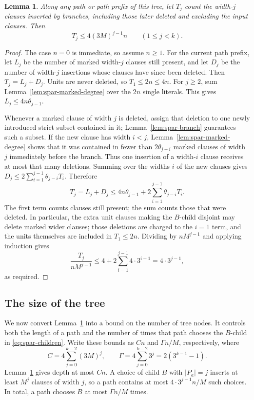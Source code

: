 \documentclass[11pt,reqno]{amsart}
\numberwithin{equation}{section}
\newtheorem{lemma}[theorem]{Lemma}
\theoremstyle{definition}\newtheorem{definition}[theorem]{Definition}
\theoremstyle{remark}\newtheorem{remark}[theorem]{Remark}
\renewcommand{\le}{\leqslant}
\renewcommand{\ge}{\geqslant}
\begin{document}
\begin{lemma}\label{lem:spar-insertion-bound}
Along any path or path prefix of this tree, let $T_j$ count the
width-$j$ clauses inserted by branches, including those later deleted
and excluding the input clauses. Then
\[
 T_j\le4(3M)^{j-1}n\qquad(1\le j<k).
\]
\end{lemma}
\begin{proof}
The case $n=0$ is immediate, so assume $n\ge1$.
For the current path prefix, let $L_j$ be the number of marked
width-$j$ clauses still present, and let $D_j$ be the number of
width-$j$ insertions whose clauses have since been deleted.
Then $T_j=L_j+D_j$.
Units are never deleted, so $T_1\le2n\le4n$.
For $j\ge2$, sum Lemma~\ref{lem:spar-marked-degree} over the $2n$
single literals. This gives $L_j\le4n\theta_{j-1}$.

Whenever a marked clause of width $j$ is deleted, assign that deletion
to one newly introduced strict subset contained in it;
Lemma~\ref{lem:spar-branch} guarantees such a subset.
If the new clause has width $i<j$, Lemma~\ref{lem:spar-marked-degree}
shows that it was contained in fewer than $2\theta_{j-i}$ marked
clauses of width $j$ immediately before the branch.
Thus one insertion of a width-$i$ clause receives at most that
many deletions. Summing over the widths $i$ of the new clauses gives
$D_j\le2\sum_{i=1}^{j-1}\theta_{j-i}T_i$. Therefore
\begin{equation}\label{eq:spar-insertions}
 T_j=L_j+D_j\le4n\theta_{j-1}
       +2\sum_{i=1}^{j-1}\theta_{j-i}T_i.
\end{equation}
The first term counts clauses still present; the sum counts those that
were deleted. In particular, the extra unit clauses making the
$B$-child disjoint may delete marked wider clauses; those deletions
are charged to the $i=1$ term, and the units themselves are included
in $T_1\le2n$. Dividing by $nM^{j-1}$ and applying induction gives
\[
 \frac{T_j}{nM^{j-1}}
 \le4+2\sum_{i=1}^{j-1}4\cdot3^{i-1}
 =4\cdot3^{j-1},
\]
as required.
\end{proof}

\subsection{The size of the tree}
We now convert Lemma~\ref{lem:spar-insertion-bound} into a bound on
the number of tree nodes. It controls both the length of a path
and the number of times that path chooses the $B$-child in
\eqref{eq:spar-children}. Write these bounds as $Cn$ and
$\Gamma n/M$, respectively, where
\[
 C=4\sum_{j=0}^{k-2}(3M)^j,\qquad
 \Gamma=4\sum_{j=0}^{k-2}3^j=2(3^{k-1}-1).
\]
Lemma~\ref{lem:spar-insertion-bound} gives depth at most $Cn$.
A choice of child $B$ with $|P_a|=j$ inserts at least $M^j$
clauses of width $j$, so a path contains at most
$4\cdot3^{j-1}n/M$ such choices.
In total, a path chooses $B$ at most $\Gamma n/M$ times.
\end{document}
